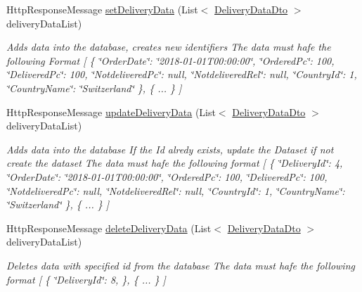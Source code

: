 \begin{DoxyCompactItemize}
Http\+Response\+Message \hyperlink{classkpi_mvc_api_1_1_controllers_1_1_kpidata_controller_ae0c16d6b3d009224eae6ea5a2b20aabd}{set\+Delivery\+Data} (List$<$ \hyperlink{classkpi_mvc_api_1_1_data_transfer_objects_1_1_delivery_data_dto}{Delivery\+Data\+Dto} $>$ delivery\+Data\+List)
\begin{DoxyCompactList}\small\item\em Adds data into the database, creates new identifiers The data must hafe the following Format \mbox{[} \{ \char`\"{}\+Order\+Date\char`\"{}\+: \char`\"{}2018-\/01-\/01\+T00\+:00\+:00\char`\"{}, \char`\"{}\+Ordered\+Pc\char`\"{}\+: 100, \char`\"{}\+Delivered\+Pc\char`\"{}\+: 100, \char`\"{}\+Notdelivered\+Pc\char`\"{}\+: null, \char`\"{}\+Notdelivered\+Rel\char`\"{}\+: null, \char`\"{}\+Country\+Id\char`\"{}\+: 1, \char`\"{}\+Country\+Name\char`\"{}\+: \char`\"{}\+Switzerland\char`\"{} \}, \{ ... \} \mbox{]} \end{DoxyCompactList}\item 
Http\+Response\+Message \hyperlink{classkpi_mvc_api_1_1_controllers_1_1_kpidata_controller_a893e7ff73b6dbd31afa5e1aa73e5abae}{update\+Delivery\+Data} (List$<$ \hyperlink{classkpi_mvc_api_1_1_data_transfer_objects_1_1_delivery_data_dto}{Delivery\+Data\+Dto} $>$ delivery\+Data\+List)
\begin{DoxyCompactList}\small\item\em Adds data into the database If the Id alredy exists, update the Dataset if not create the dataset The data must hafe the following format \mbox{[} \{ \char`\"{}\+Delivery\+Id\char`\"{}\+: 4, \char`\"{}\+Order\+Date\char`\"{}\+: \char`\"{}2018-\/01-\/01\+T00\+:00\+:00\char`\"{}, \char`\"{}\+Ordered\+Pc\char`\"{}\+: 100, \char`\"{}\+Delivered\+Pc\char`\"{}\+: 100, \char`\"{}\+Notdelivered\+Pc\char`\"{}\+: null, \char`\"{}\+Notdelivered\+Rel\char`\"{}\+: null, \char`\"{}\+Country\+Id\char`\"{}\+: 1, \char`\"{}\+Country\+Name\char`\"{}\+: \char`\"{}\+Switzerland\char`\"{} \}, \{ ... \} \mbox{]} \end{DoxyCompactList}\item 
Http\+Response\+Message \hyperlink{classkpi_mvc_api_1_1_controllers_1_1_kpidata_controller_a2494970082b1b00fd50353e4aa840188}{delete\+Delivery\+Data} (List$<$ \hyperlink{classkpi_mvc_api_1_1_data_transfer_objects_1_1_delivery_data_dto}{Delivery\+Data\+Dto} $>$ delivery\+Data\+List)
\begin{DoxyCompactList}\small\item\em Deletes data with specified id from the database The data must hafe the following format \mbox{[} \{ \char`\"{}\+Delivery\+Id\char`\"{}\+: 8, \}, \{ ... \} \mbox{]} \end{DoxyCompactList}\item 

\end{DoxyCompactItemize}
